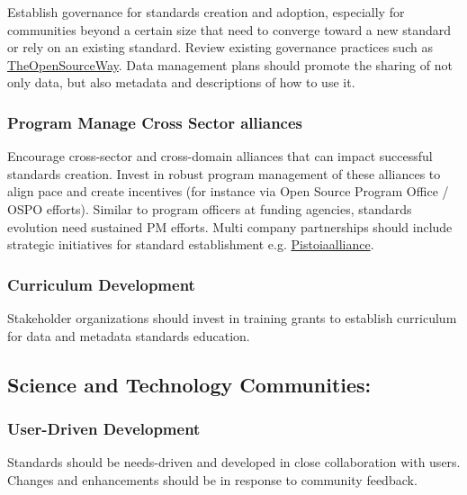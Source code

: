 \documentclass[
  letterpaper,
  DIV=11,
  numbers=noendperiod]{scrartcl}
\begin{document}
Establish governance for standards creation and adoption, especially for
communities beyond a certain size that need to converge toward a new
standard or rely on an existing standard. Review existing governance
practices such as
\href{https://www.theopensourceway.org/the_open_source_way-guidebook-2.0.html\#_project_and_community_governance}{TheOpenSourceWay}.
Data management plans should promote the sharing of not only data, but
also metadata and descriptions of how to use it.

\subsubsection{Program Manage Cross Sector
alliances}\label{program-manage-cross-sector-alliances}

Encourage cross-sector and cross-domain alliances that can impact
successful standards creation. Invest in robust program management of
these alliances to align pace and create incentives (for instance via
Open Source Program Office / OSPO efforts). Similar to program officers
at funding agencies, standards evolution need sustained PM efforts.
Multi company partnerships should include strategic initiatives for
standard establishment e.g.
\href{https://www.pistoiaalliance.org/news/press-release-pistoia-alliance-launches-idmp-1-0/}{Pistoiaalliance}.

\subsubsection{Curriculum Development}\label{curriculum-development}

Stakeholder organizations should invest in training grants to establish
curriculum for data and metadata standards education.

\subsection{Science and Technology
Communities:}\label{science-and-technology-communities}

\subsubsection{User-Driven Development}\label{user-driven-development}

Standards should be needs-driven and developed in close collaboration
with users. Changes and enhancements should be in response to community
feedback.
\end{document}
